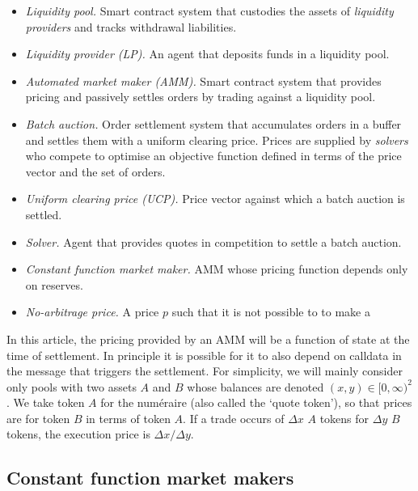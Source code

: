 \documentclass[a4paper,10pt]{article}
\theoremstyle{remark}
\begin{document}
\begin{itemize}

  \item \emph{Liquidity pool.} Smart contract system that custodies the assets of \emph{liquidity providers} and tracks withdrawal liabilities.
  
  \item \emph{Liquidity provider (LP).} An agent that deposits funds in a liquidity pool.
  
  \item \emph{Automated market maker (AMM).} Smart contract system that provides pricing and passively settles orders by trading against a liquidity pool.
  
  \item \emph{Batch auction.} Order settlement system that accumulates orders in a buffer and settles them with a uniform clearing price.
  Prices are supplied by \emph{solvers} who compete to optimise an objective function defined in terms of the price vector and the set of orders.
  
  \item \emph{Uniform clearing price (UCP).} Price vector against which a batch auction is settled.
  
  \item \emph{Solver.} Agent that provides quotes in competition to settle a batch auction.
  
  \item \emph{Constant function market maker.} AMM whose pricing function depends only on reserves.
  
  \item \emph{No-arbitrage price.} A price $p$ such that it is not possible to to make a 
  
\end{itemize}

In this article, the pricing provided by an AMM will be a function of state at the time of settlement. In principle it is possible for it to also depend on calldata in the message that triggers the settlement.
%
For simplicity, we will mainly consider only pools with two assets $A$ and $B$ whose balances are denoted $(x,y)\in [0,\infty)^2$.
%
We take token $A$ for the num\'eraire (also called the `quote token'), so that prices are for token $B$ in terms of token $A$.
%
If a trade occurs of $\Delta x$ $A$ tokens for $\Delta y$ $B$ tokens, the execution price is $\Delta x/\Delta y$.

\subsection{Constant function market makers}
\end{document}
